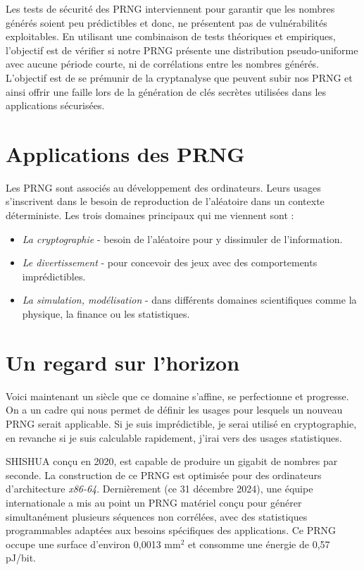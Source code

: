 \documentclass[9pt,a4paper,twoside,english]{class/backend}
\begin{document}
    \hspace{10pt}Les tests de sécurité des PRNG interviennent pour garantir que les nombres générés soient peu prédictibles et donc, ne présentent pas de vulnérabilités exploitables. En utilisant une combinaison de tests théoriques et empiriques, l'objectif est de vérifier si notre PRNG présente une distribution pseudo-uniforme avec aucune période courte, ni de corrélations entre les nombres générés. L'objectif est de se prémunir de la cryptanalyse que peuvent subir nos PRNG et ainsi offrir une faille lors de la génération de clés secrètes utilisées dans les applications sécurisées.


\section{Applications des PRNG}

    \hspace{10pt}Les PRNG sont associés au développement des ordinateurs. Leurs usages s'inscrivent dans le besoin de reproduction de l'aléatoire dans un contexte déterministe. Les trois domaines principaux qui me viennent sont :
    \begin{itemize}
        \item \textit{La cryptographie} - besoin de l'aléatoire pour y dissimuler de l'information.
        \item \textit{Le divertissement} - pour concevoir des jeux avec des comportements imprédictibles.
        \item \textit{La simulation, modélisation} - dans différents domaines scientifiques comme la physique, la finance ou les statistiques.
    \end{itemize}

\section{Un regard sur l'horizon}

    \hspace{10pt}Voici maintenant un siècle que ce domaine s'affine, se perfectionne et progresse. On a un cadre qui nous permet de définir les usages pour lesquels un nouveau PRNG serait applicable. Si je suis imprédictible, je serai utilisé en cryptographie, en revanche si je suis calculable rapidement, j'irai vers des usages statistiques. 

    SHISHUA \cite{shishua} conçu en 2020, est capable de produire un gigabit de nombres par seconde. La construction de ce PRNG est optimisée pour des ordinateurs d'architecture \textit{x86-64}. Dernièrement (ce 31 décembre 2024), une équipe internationale a mis au point un PRNG matériel \cite{wu2024pseudorandomnumbergeneratormultisequence} conçu pour générer simultanément plusieurs séquences non corrélées, avec des statistiques programmables adaptées aux besoins spécifiques des applications. Ce PRNG occupe une surface d'environ 0,0013 mm$^2$ et consomme une énergie de 0,57 pJ/bit.
\end{document}
